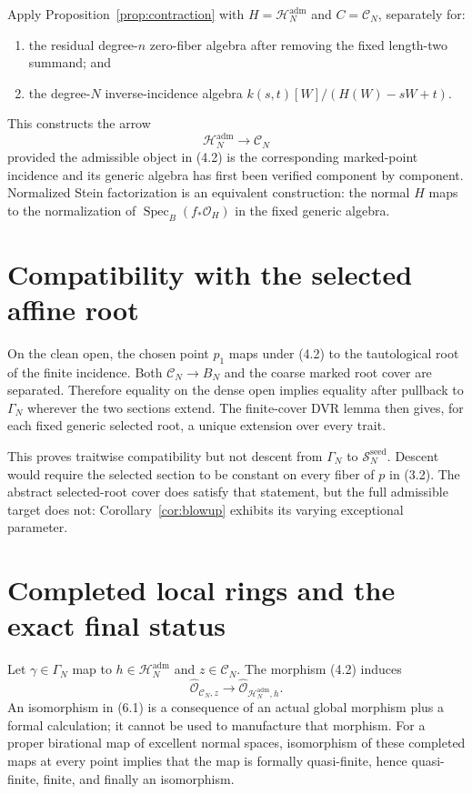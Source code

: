 \documentclass[11pt]{article}
\newcommand{\Spec}{\operatorname{Spec}}
\begin{document}
Apply Proposition~\ref{prop:contraction} with
$H=\mathscr H_N^{\mathrm{adm}}$ and $C=\mathcal C_N$, separately for:
\begin{enumerate}
\item the residual degree-$n$ zero-fiber algebra after removing the fixed
length-two summand; and
\item the degree-$N$ inverse-incidence algebra
$k(s,t)[W]/(H(W)-sW+t)$.
\end{enumerate}
This constructs the arrow
\[
 \mathscr H_N^{\mathrm{adm}}\longrightarrow\mathcal C_N              \tag{4.2}
\]
provided the admissible object in (4.2) is the corresponding marked-point
incidence and its generic algebra has first been verified component by
component.  Normalized Stein factorization is an equivalent construction:
the normal $H$ maps to the normalization of
$\Spec_B(f_*\mathcal O_H)$ in the fixed generic algebra.

\section{Compatibility with the selected affine root}

On the clean open, the chosen point $p_1$ maps under (4.2) to the
tautological root of the finite incidence.  Both $\mathcal C_N\to B_N$ and
the coarse marked root cover are separated.  Therefore equality on the dense
open implies equality after pullback to $\Gamma_N$ wherever the two sections
extend.  The finite-cover DVR lemma then gives, for each fixed generic
selected root, a unique extension over every trait.

This proves traitwise compatibility but not descent from $\Gamma_N$ to
$\mathscr S_N^{\mathrm{seed}}$.  Descent would require the selected section
to be constant on every fiber of $p$ in (3.2).  The abstract selected-root
cover does satisfy that statement, but the full admissible target does not:
Corollary~\ref{cor:blowup} exhibits its varying exceptional parameter.

\section{Completed local rings and the exact final status}

Let $\gamma\in\Gamma_N$ map to $h\in\mathscr H_N^{\mathrm{adm}}$ and
$z\in\mathcal C_N$.  The morphism (4.2) induces
\[
 \widehat{\mathcal O}_{\mathcal C_N,z}
 \longrightarrow
 \widehat{\mathcal O}_{\mathscr H_N^{\mathrm{adm}},h}.              \tag{6.1}
\]
An isomorphism in (6.1) is a consequence of an actual global morphism plus a
formal calculation; it cannot be used to manufacture that morphism.
For a proper birational map of excellent normal spaces, isomorphism of these
completed maps at every point implies that the map is formally
quasi-finite, hence quasi-finite, finite, and finally an isomorphism.
\end{document}
